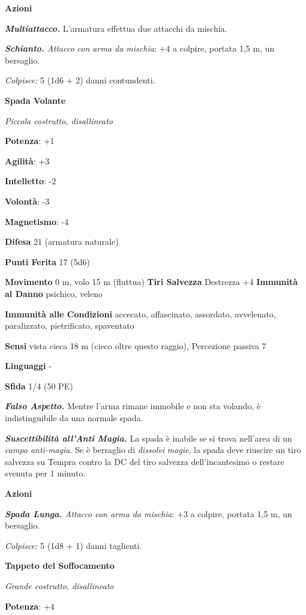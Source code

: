 \begin{multicols}{2}
\textbf{Azioni}

\emph{\textbf{Multiattacco.}} L'armatura effettua due attacchi da
mischia.

\emph{\textbf{Schianto.} Attacco con arma da mischia}: +4 a colpire,
portata 1,5 m, un bersaglio.

\emph{Colpisce:} 5 (1d6 + 2) danni contundenti.

\textbf{Spada Volante}

\emph{Piccola costrutto, disallineato}

\textbf{Potenza}: +1

\textbf{Agilità}: +3

\textbf{Intelletto}: -2

\textbf{Volontà}: -3

\textbf{Magnetismo}: -4

\textbf{Difesa} 21 (armatura naturale)

\textbf{Punti Ferita} 17 (5d6)

\textbf{Movimento} 0 m, volo 15 m (fluttua) \textbf{Tiri Salvezza}
Destrezza +4 \textbf{Immunità al Danno} psichico, veleno

\textbf{Immunità alle Condizioni} accecato, affascinato, assordato,
avvelenato, paralizzato, pietrificato, spaventato

\textbf{Sensi} vista cieca 18 m (cieco oltre questo raggio), Percezione
passiva 7

\textbf{Linguaggi} -

\textbf{Sfida} 1/4 (50 PE)

\emph{\textbf{Falso Aspetto.}} Mentre l'arma rimane immobile e non sta
volando, è indistinguibile da una normale spada.

\emph{\textbf{Suscettibilità all'Anti Magia.}} La spada è inabile se si
trova nell'area di un \emph{campo anti-magia}. Se è bersaglio di
\emph{dissolvi} \emph{magie}, la spada deve riuscire un tiro salvezza su Tempra contro la DC del tiro salvezza dell'incantesimo o restare
svenuta per 1 minuto.

\textbf{Azioni}

\emph{\textbf{Spada Lunga.} Attacco con arma da mischia}: +3 a colpire,
portata 1,5 m, un bersaglio.

\emph{Colpisce:} 5 (1d8 + 1) danni taglienti.



\textbf{Tappeto del Soffocamento}

\emph{Grande costrutto, disallineato}

\textbf{Potenza}: +4


\end{multicols}
